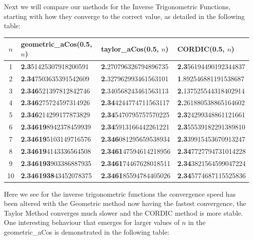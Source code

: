 {\\
\\

Next we will compare our methods for the Inverse Trigonometric Functions, starting with how they converge to the correct value, as detailed in the following table:

{\selectfont
\begin{center}
\begin{tabular}{|c|l|l|l|}
\hline
\(n\) & \textrm{geometric\_aCos(0.5, \(n\))}
	  & \textrm{taylor\_aCos(0.5, \(n\))}
	  & \textrm{CORDIC(0.5, \(n\))}\\\hline
1 & \textbf{2.3}51425307918200591
&\textbf{2.}270796326794896735
&\textbf{2.3}56194490192344837\\\hline
2 & \textbf{2.34}7503635391542609
&\textbf{2.}327962993461563101
&\textbf{1}.892546881191538687\\\hline
3 & \textbf{2.346}521397812842746
&\textbf{2.}340568243461563113
&\textbf{2.}137525544318402914\\\hline
4 & \textbf{2.346}275724597314926
&\textbf{2.34}4244774711563117
&\textbf{2.}261880538865164602\\\hline
5 & \textbf{2.346}214299177873829
&\textbf{2.34}5470795757570225
&\textbf{2.3}24299348861121661\\\hline
6 & \textbf{2.34619}8942378459939
&\textbf{2.34}5913166442261221
&\textbf{2.3}55539182291389810\\\hline
7 & \textbf{2.34619}5103149716576
&\textbf{2.346}081295659538934
&\textbf{2.3}39915453670913247\\\hline
8 & \textbf{2.34619}4143336564508
&\textbf{2.3461}47594614218956
&\textbf{2.34}7727794731014228\\\hline
9 & \textbf{2.346193}903386887935
&\textbf{2.3461}74467628018511
&\textbf{2.34}3821564599047224\\\hline
10& \textbf{2.3461938}43452078375
&\textbf{2.3461}85594784405026
&\textbf{2.34}5774687115525836\\\hline

\end{tabular}
\end{center}}

Here we see for the inverse trigonometric functions the convergence speed has been altered with the Geometric method now having the fastest convergence, the Taylor Method converges much slower and the CORDIC method is more stable. One interesting behaviour that emerges for larger values of \(n\) in the \textrm{geometric\_aCos} is demonstrated in the following table:

}
